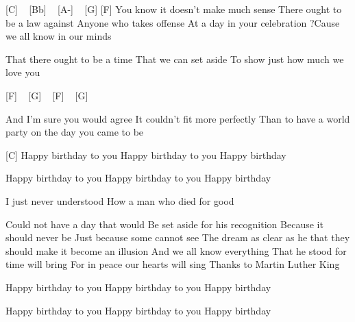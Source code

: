 [C] ~ [Bb] ~ [A-] ~ [G] [F]
You know it doesn't make much sense
There ought to be a law against
Anyone who takes offense
At a day in your celebration
?Cause we all know in our minds

That there ought to be a time
That we can set aside
To show just how much we love you

[F] ~ [G] ~ [F] ~ [G] ~

And I'm sure you would agree
It couldn't fit more perfectly
Than to have a world party on the day you came to be

[C]
Happy birthday to you
Happy birthday to you
Happy birthday

Happy birthday to you
Happy birthday to you
Happy birthday

I just never understood
How a man who died for good

Could not have a day that would
Be set aside for his recognition
Because it should never be
Just because some cannot see
The dream as clear as he
that they should make it become an illusion
And we all know everything
That he stood for time will bring
For in peace our hearts will sing
Thanks to Martin Luther King

Happy birthday to you
Happy birthday to you
Happy birthday

Happy birthday to you
Happy birthday to you
Happy birthday 